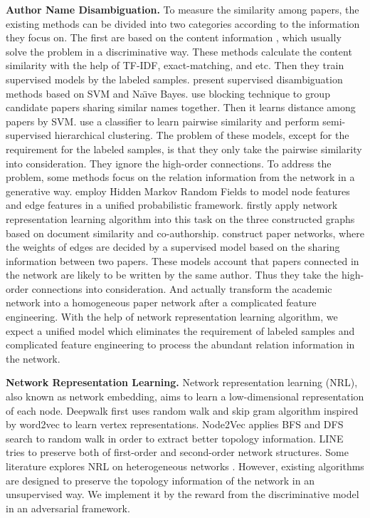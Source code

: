 \documentclass[letterpaper]{article}
\newcommand{\citet}[1]{{\citeauthor{#1} \shortcite{#1}}}
\begin{document}
\noindent \textbf{Author Name Disambiguation.}%
To measure the similarity among papers, the existing methods can be divided into two categories according to the information they focus on.
The first are based on the content information \cite{han:2014,Huang:2006,Block,Yoshida:2010}, which usually solve the problem in a discriminative way.
These methods calculate the content similarity with the help of TF-IDF, exact-matching, and etc.
Then they train supervised models by the labeled samples.
\citet{han:2014} present supervised disambiguation methods based on SVM and Na\"\i ve Bayes.
\citeauthor{Huang:2006} use blocking technique to group candidate papers sharing similar names together. Then it learns distance among papers by SVM.
\citet{Block} use a classifier to learn pairwise similarity and perform semi-supervised hierarchical clustering.
The problem of these models, except for the requirement for the labeled samples,  is that they only take the pairwise similarity into consideration.
They ignore the high-order connections.
To address the problem, some methods focus on the relation information from the network \cite{Anonymized,Hermansson:2013} in a generative way.
\citet{Tang:2012} employ Hidden Markov Random Fields to model node features and edge features in a unified probabilistic framework.
\citet{Anonymized} firstly apply network representation learning algorithm into this task on the three constructed graphs based on document similarity and co-authorship.
\citet{JieTang} construct paper networks, where the weights of edges are decided by a supervised model based on the sharing information between two papers.
These models account that papers connected in the network are likely to be written by the same author. Thus they take the high-order connections into consideration.
And \citet{JieTang} actually transform the academic network into a homogeneous paper network after a complicated feature engineering.
With the help of network representation learning algorithm, we expect a unified model which eliminates the requirement of labeled samples and complicated feature engineering to process the abundant relation information in the network.

\noindent \textbf{Network Representation Learning.}
Network representation learning (NRL), also known as network embedding, aims to learn a low-dimensional representation of each node.
Deepwalk \cite{DeepWalk} first uses random walk and skip gram algorithm inspired by word2vec \cite{word2vec1,wor2vec2} to learn vertex representations.
Node2Vec \cite{Node2vec} applies BFS and DFS search to random walk in order to extract better topology information.
LINE \cite{LINE} tries to preserve both of first-order and second-order network structures.
Some literature explores NRL on heterogeneous networks \cite{PTE,Metapath2Vec}.
However, existing algorithms are designed to preserve the topology information of the network in an unsupervised way.
We implement it by the reward from the discriminative model in an adversarial framework.
\end{document}
